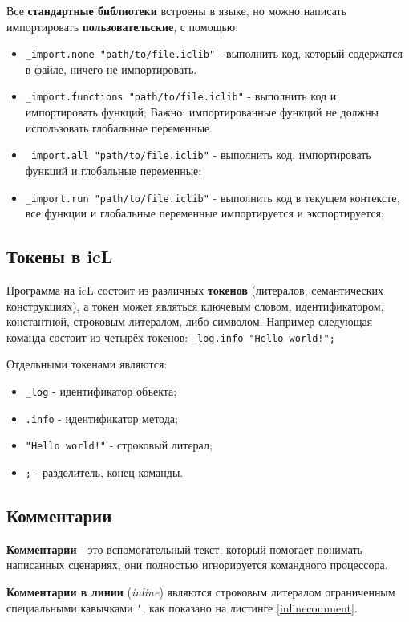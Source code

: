 \documentclass[a4paper, 14pt]{extarticle}
\newenvironment{icItems}
	{ \begin{itemize} [noitemsep,nolistsep] }
	{ \end{itemize} }
\begin{document}
	Все \textbf{стандартные библиотеки} встроены в языке, но можно написать импортировать \textbf{пользовательские}, с помощью:
\begin{icItems}
	\item \lstinline`_import.none "path/to/file.iclib"` - выполнить код, который содержатся в файле, ничего не импортировать.
	\item \lstinline`_import.functions "path/to/file.iclib"` - выполнить код и импортировать функций; {\color{red}Важно:} импортированные функций не должны использовать глобальные переменные.
	\item \lstinline`_import.all "path/to/file.iclib"` -  выполнить код, импортировать функций и глобальные переменные;
	\item \lstinline`_import.run "path/to/file.iclib"` - выполнить код в текущем контексте, все функции и глобальные переменные импортируется и экспортируется;
\end{icItems}
	
\subsection{Токены в icL}
	
	Программа на icL состоит из различных \textbf{токенов} (литералов, семантических конструкциях), а токен может являться ключевым словом, идентификатором, константной, строковым литералом, либо символом. Например следующая команда состоит из четырёх токенов: \lstinline`_log.info "Hello world!";`
	
	Отдельными токенами являются:
\begin{icItems}
	\item \lstinline`_log` - идентификатор объекта;
	\item \lstinline`.info` - идентификатор метода;
	\item \lstinline`"Hello world!"` - строковый литерал;
	\item \lstinline`;` - разделитель, конец команды.
\end{icItems}
	
\subsection{Комментарии}
	
	\textbf{Комментарии} - это вспомогательный текст, который помогает понимать написанных сценариях, они полностью игнорируется командного процессора. 
	
	\textbf{Комментарии в линии} (\textit{inline}) являются строковым литералом ограниченным специальными кавычками \texttt{`}, как показано на листинге \ref{inlinecomment}.
	
\end{document}

